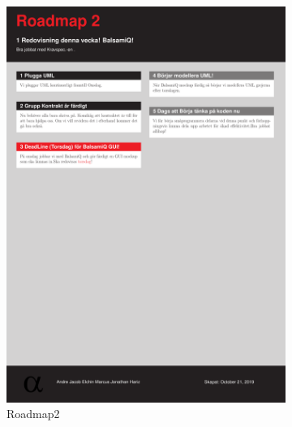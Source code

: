 \documentclass{article}
\theoremstyle{remark}                                         %
\begin{document}
\begin{figure}
\begin{subfigure}[b]{0.3\textwidth}
        \includegraphics[width=\textwidth]{img/OBJKURS1_Roadmap2.pdf}
        \caption{Roadmap2}
        \label{fig:road2}
    \end{subfigure}
    \begin{subfigure}[b]{0.3\textwidth}

\end{subfigure}
\end{figure}
\end{document}

